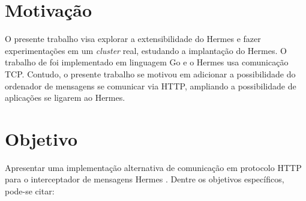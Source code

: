 \section{Motivação}

O presente trabalho visa explorar a extensibilidade do Hermes e fazer experimentações em um 
\textit{cluster} real, estudando a implantação do Hermes. O trabalho de 
\textcite{renan2021hermes} foi implementado em linguagem Go e o Hermes usa comunicação TCP. Contudo, o presente trabalho se motivou em adicionar a possibilidade do ordenador de mensagens se comunicar via HTTP, ampliando a possibilidade de aplicações se ligarem ao Hermes.

\section{Objetivo}




Apresentar uma implementação alternativa de comunicação em protocolo HTTP para o interceptador de mensagens Hermes \cite{renan2021hermes}.
Dentre os objetivos específicos, pode-se citar:



